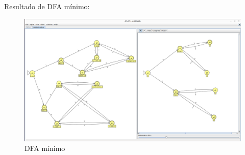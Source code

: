 \documentclass[11pt]{report}
\begin{document}
\newpage

Resultado de DFA mínimo:
\begin{figure}[H]
  \centering
  \includegraphics[scale=0.2]{img/mod_minimized.png}
  \caption{DFA mínimo}
\end{figure}
\end{document}
